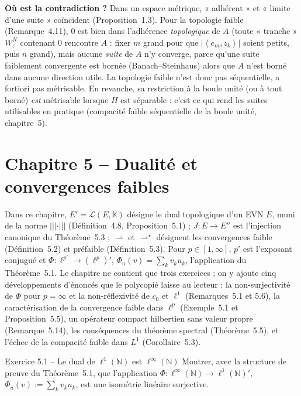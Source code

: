 \documentclass[11pt,a4paper]{article}
\newcommand{\N}{\mathbb{N}}
\newcommand{\K}{\mathbb{K}}
\newcommand{\opnorm}[1]{|\!|\!|#1|\!|\!|}
\newcommand{\Lc}{\mathcal{L}}
\newcommand{\ps}[2]{\left\langle #1,#2\right\rangle}
\theoremstyle{definition}
\begin{document}
\begin{pointcle}
\textbf{Où est la contradiction ?} Dans un espace métrique, « adhérent » et « limite d'une suite » coïncident (Proposition~1.3). Pour la topologie faible (Remarque~4.11), $0$ est bien dans l'adhérence \emph{topologique} de $A$ (toute « tranche » $W^N_\varepsilon$ contenant $0$ rencontre $A$ : fixer $m$ grand pour que $|\ps{e_m}{z_k}|$ soient petits, puis $n$ grand), mais aucune \emph{suite} de $A$ n'y converge, parce qu'une suite faiblement convergente est bornée (Banach--Steinhaus) alors que $A$ n'est borné dans aucune direction utile. La topologie faible n'est donc pas séquentielle, a fortiori pas métrisable. En revanche, sa restriction à la boule unité (ou à tout borné) \emph{est} métrisable lorsque $H$ est séparable : c'est ce qui rend les suites utilisables en pratique (compacité faible séquentielle de la boule unité, chapitre~5).
\end{pointcle}


\section{Chapitre 5 -- Dualité et convergences faibles}

\begin{commentaire}
Dans ce chapitre, $E'=\Lc(E,\K)$ désigne le dual topologique d'un EVN $E$, muni de la norme $\opnorm\cdot$ (Définition~4.8, Proposition~5.1) ; $J:E\to E''$ est l'injection canonique du Théorème~5.3 ; $\rightharpoonup$ et $\rightharpoonup^\star$ désignent les convergences faible (Définition~5.2) et préfaible (Définition~5.3). Pour $p\in[1,\infty]$, $p'$ est l'exposant conjugué et $\Phi:\ell^{p'}\to(\ell^p)'$, $\Phi_u(v)=\sum_kv_ku_k$, l'application du Théorème~5.1. Le chapitre ne contient que trois exercices ; on y ajoute cinq développements d'énoncés que le polycopié laisse au lecteur : la non-surjectivité de $\Phi$ pour $p=\infty$ et la non-réflexivité de $c_0$ et $\ell^1$ (Remarques~5.1 et 5.6), la caractérisation de la convergence faible dans $\ell^p$ (Exemple~5.1 et Proposition~5.5), un opérateur compact hilbertien sans valeur propre (Remarque~5.14), les conséquences du théorème spectral (Théorème~5.5), et l'échec de la compacité faible dans $L^1$ (Corollaire~5.3).
\end{commentaire}

\begin{exo}{Exercice 5.1 -- Le dual de $\ell^1(\N)$ est $\ell^\infty(\N)$}
Montrer, avec la structure de preuve du Théorème~5.1, que l'application $\Phi:\ell^\infty(\N)\to\ell^1(\N)'$, $\Phi_u(v):=\sum_kv_ku_k$, est une isométrie linéaire surjective.
\end{exo}
\end{document}
